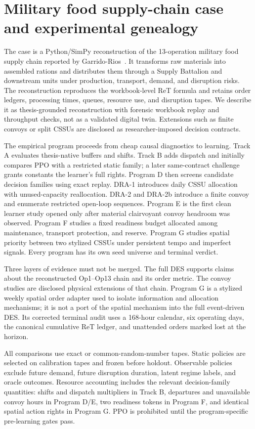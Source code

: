 \section{Military food supply-chain case and experimental genealogy}\label{sec:case}

The case is a Python/SimPy reconstruction of the 13-operation military food supply chain
reported by Garrido-Rios~\cite{garrido2017}. It transforms raw materials into assembled
rations and distributes them through a Supply Battalion and downstream units under production,
transport, demand, and disruption risks. The reconstruction reproduces the workbook-level ReT
formula and retains order ledgers, processing times, queues, resource use, and disruption
tapes. We describe it as thesis-grounded reconstruction with forensic workbook replay and
throughput checks, not as a validated digital twin. Extensions such as finite convoys or split
CSSUs are disclosed as researcher-imposed decision contracts.

The empirical program proceeds from cheap causal diagnostics to learning. Track A evaluates
thesis-native buffers and shifts. Track B adds dispatch and initially compares PPO with a
restricted static family; a later same-contract challenge grants constants the learner's full
rights. Program D then screens candidate decision families using exact replay. DRA-1 introduces
daily CSSU allocation with unused-capacity reallocation. DRA-2 and DRA-2b introduce a finite
convoy and enumerate restricted open-loop sequences. Program E is the first clean learner study
opened only after material clairvoyant convoy headroom was observed. Program F studies a fixed
readiness budget allocated among maintenance, transport protection, and reserve. Program G
studies spatial priority between two stylized CSSUs under persistent tempo and imperfect
signals. Every program has its own seed universe and terminal verdict.

Three layers of evidence must not be merged. The full DES supports claims about the reconstructed
Op1--Op13 chain and its order metric. The convoy studies are disclosed physical extensions of
that chain. Program G is a stylized weekly spatial order adapter used to isolate information and
allocation mechanisms; it is not a port of the spatial mechanism into the full event-driven
DES. Its corrected terminal audit uses a 168-hour calendar, six operating days, the canonical
cumulative ReT ledger, and unattended orders marked lost at the horizon.

All comparisons use exact or common-random-number tapes. Static policies are selected on
calibration tapes and frozen before holdout. Observable policies exclude future demand,
future disruption duration, latent regime labels, and oracle outcomes. Resource accounting
includes the relevant decision-family quantities: shifts and dispatch multipliers in Track B,
departures and unavailable convoy hours in Program D/E, two readiness tokens in Program F,
and identical spatial action rights in Program G. PPO is prohibited until the program-specific
pre-learning gates pass.

